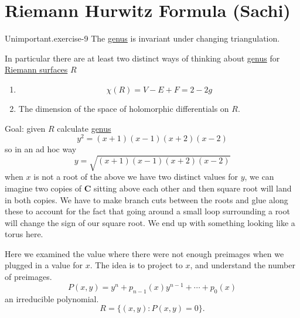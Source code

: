 \documentclass[10pt,]{book}
\numberwithin{equation}{section}
\newcommand{\CC}{\mathbf{C}}
\begin{document}
\section[{Riemann Hurwitz Formula (Sachi)}]{Riemann Hurwitz Formula (Sachi)}\label{sec-riemann-hurwitz}
\begin{inlineexercise}{Unimportant.}{exercise-9}%
\hypertarget{p-509}{}%
The \hyperref[fact-existance-genus]{genus} is invariant under changing triangulation.%
\end{inlineexercise}
\hypertarget{p-510}{}%
In particular there are at least two distinct ways of thinking about \hyperref[fact-existance-genus]{genus} for \hyperref[def-top-riem-surface]{Riemann surfaces} \(R\)\leavevmode%
\begin{enumerate}
\item\hypertarget{li-101}{}%
\begin{equation*}
\chi(R) = V -E + F = 2-2g
\end{equation*}
%
\item\hypertarget{li-102}{}The dimension of the space of holomorphic differentials on \(R\).%
\end{enumerate}
%
\par
\hypertarget{p-511}{}%
Goal: given \(R\) calculate \hyperref[fact-existance-genus]{genus}%
\begin{equation*}
y^2 = (x+1)(x-1)(x+2)(x-2)
\end{equation*}
so in an ad hoc way%
\begin{equation*}
y = \sqrt{(x+1)(x-1)(x+2)(x-2)}
\end{equation*}
when \(x\) is not a root of the above we have two distinct values for \(y\), we can imagine two copies of \(\CC\) sitting above each other and then square root will land in both copies. We have to make branch cuts between the roots and glue along these to account for the fact that going around a small loop surrounding a root will change the sign of our square root. We end up with something looking like a torus here.%
\par
\hypertarget{p-512}{}%
Here we examined the value where there were not enough preimages when we plugged in a value for \(x\). The idea is to project to \(x\), and understand the number of preimages.%
\begin{equation*}
P(x,y) = y^n + p_{n-1}(x) y^{n-1} + \cdots + p_0(x)
\end{equation*}
an  irreducible polynomial.%
\begin{equation*}
R= \{(x,y) : P(x,y) = 0\}\text{.}
\end{equation*}
\end{document}
